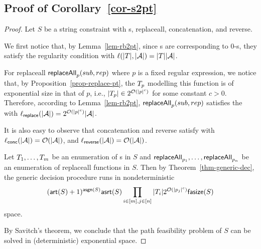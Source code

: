 



\subsection{Proof of Corollary~\ref{cor-s2pt}}
%
\begin{proof}
Let $S$ be a string constraint with \FT{}s, replaceall, concatenation, and reverse.

We first notice that, by Lemma~\ref{lem-rb2pt}, since \FT{}s are corresponding to 0-\RBPPT{}s, they satisfy the regularity condition \prerec{} with  $\ell(|T|, |\mathcal{A}|) = |T||\mathcal{A}|$. 

For replaceall  $\mathsf{replaceAll}_{p}(sub, rep)$ where $p$ is a fixed regular expression, we notice that, by Proposition~\ref{prop-replace-pt}, the \PT{} $T_p$ modelling this function is of exponential size in that of $p$, i.e., $|T_p| \in 2^{\mathcal{O}(|p|^c)}$ for some constant $c > 0$. Therefore, according to Lemma~\ref{lem-rb2pt}, $\mathsf{replaceAll}_{p}(sub, rep)$ satisfies the  \prerec{} with  $\ell_{\sf replace}(|\mathcal{A}|) =  2^{\mathcal{O}(|p|^c)} |\mathcal{A}|$.

It is also easy to observe that concatenation and reverse satisfy  \prerec{} with  $\ell_{\sf conc}(|\mathcal{A}|) = \mathcal{O}(|\mathcal{A}|)$, and $\ell_{\sf reverse}(|\mathcal{A}|) = \mathcal{O}(|\mathcal{A}|)$. 

Let $T_1, \ldots, T_m$ be an enumeration of  \FT{}s in $S$ and $\mathsf{replaceAll}_{p_1}, \ldots, \mathsf{replaceAll}_{p_n}$  be an enumeration of replaceall functions in $S$. Then by Theorem~\ref{thm-generic-dec}, 
the generic decision procedure runs in nondeterministic  
$$(\mathsf{art}(S)+1)^{\mathsf{asgn}(S)} \mathsf{asrt}(S) \prod \limits_{i \in [m], j \in [n]} |T_i| 2^{\mathcal{O}(|p_j|^c)} \mathsf{fasize}(S)$$
 space. 

By Savitch's theorem, we conclude that the path feasibility problem of $S$ can be solved in (deterministic) exponential space.
%
%
\end{proof}



